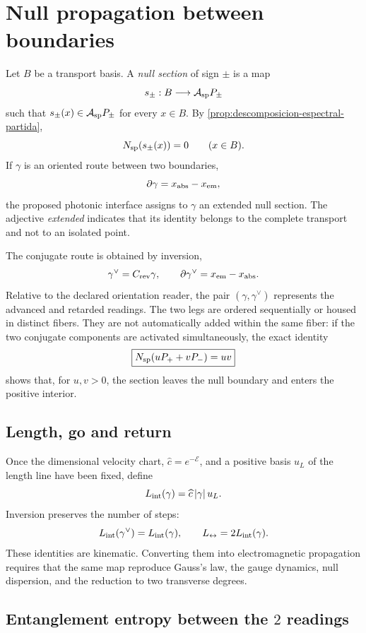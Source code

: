 \section{Null propagation between boundaries}
\label{sec:propagacion-nula-fotonica}

Let \(B\) be a transport basis. A \emph{null section} of sign
\(\pm\) is a map
\[
 s_\pm:B\longrightarrow\mathcal A_{\rm sp}P_\pm
\]
such that \(s_\pm(x)\in\mathcal A_{\rm sp}P_\pm\) for every \(x\in B\).
By \cref{prop:descomposicion-espectral-partida},
\[
 N_{\rm sp}(s_\pm(x))=0
 \qquad(x\in B).
\]
If \(\gamma\) is an oriented route between two boundaries,
\[
 \partial\gamma=x_{\rm abs}-x_{\rm em},
\]
the proposed photonic interface assigns to \(\gamma\) an extended null
section. The adjective \emph{extended} indicates that its identity belongs to the
complete transport and not to an isolated point.

The conjugate route is obtained by inversion,
\[
 \gamma^\vee=C_{\rm rev}\gamma,
 \qquad
 \partial\gamma^\vee=x_{\rm em}-x_{\rm abs}.
\]
Relative to the declared orientation reader, the pair
\((\gamma,\gamma^\vee)\) represents the advanced and retarded readings. The
two legs are ordered sequentially or housed in distinct fibers. They are not
automatically added within the same fiber: if the two conjugate components are
activated simultaneously, the exact identity
\[
 \boxed{N_{\rm sp}(uP_++vP_-)=uv}
\]
shows that, for \(u,v>0\), the section leaves the null boundary and enters the
positive interior.

\subsection{Length, go and return}

Once the dimensional velocity chart,
\(\widehat c=e^{-\mathcal E}\), and a positive basis \(u_L\) of the length
line have been fixed, define
\[
 L_{\rm int}(\gamma)=\widehat c\,|\gamma|\,u_L.
\]
Inversion preserves the number of steps:
\[
 L_{\rm int}(\gamma^\vee)=L_{\rm int}(\gamma),
 \qquad
 L_{\leftrightarrow}=2L_{\rm int}(\gamma).
\]
These identities are kinematic. Converting them into electromagnetic
propagation requires that the same map reproduce Gauss's law, the
gauge dynamics, null dispersion, and the reduction to two
transverse degrees.

\subsection{Entanglement entropy between the \(2\) readings}
\label{sec:entrelazamiento-ida-retorno}

